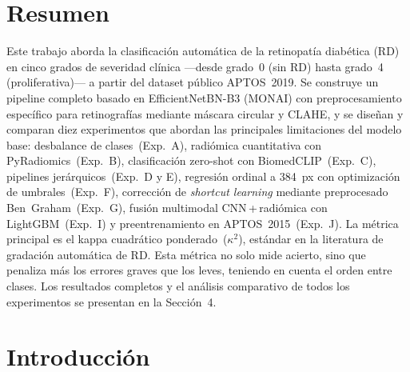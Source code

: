 \documentclass[12pt, a4paper]{article}
\begin{document}
\newpage
{}

\section*{Resumen}

Este trabajo aborda la clasificación automática de la retinopatía diabética (RD) en
cinco grados de severidad clínica ---desde grado~0 (sin RD) hasta grado~4
(proliferativa)--- a partir del dataset público APTOS~2019. Se construye un pipeline
completo basado en EfficientNetBN-B3 (MONAI) con preprocesamiento específico para
retinografías mediante máscara circular y CLAHE, y se diseñan y comparan diez
experimentos que abordan las principales limitaciones del modelo base: desbalance de
clases~(Exp.~A), radiómica cuantitativa con PyRadiomics~(Exp.~B), clasificación
zero-shot con BiomedCLIP~(Exp.~C), pipelines jerárquicos~(Exp.~D y E), regresión
ordinal a 384~px con optimización de umbrales~(Exp.~F), corrección de
\textit{shortcut learning} mediante preprocesado Ben~Graham~(Exp.~G), fusión
multimodal CNN\,+\,radiómica con LightGBM~(Exp.~I) y preentrenamiento en
APTOS~2015~(Exp.~J). La métrica principal es el kappa cuadrático ponderado~($\kappa^2$),
estándar en la literatura de gradación automática de RD. Esta métrica no solo mide acierto, sino que penaliza más los errores graves que los leves, teniendo en cuenta el orden entre clases. Los resultados completos y el análisis comparativo de todos los experimentos se presentan en la Sección~4.

\newpage
{}
\tableofcontents

\newpage
{}

\section{Introducción}
\end{document}
